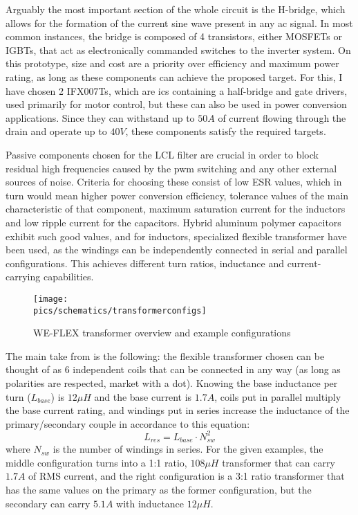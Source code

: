 Arguably the most important section of the whole circuit is the \gls{H-bridge}, which allows for the formation of the current sine wave present in any \gls{ac} signal.
In most common instances, the bridge is composed of 4 transistors, either MOSFETs or IGBTs, that act as electronically commanded switches to the inverter system. On this prototype, size and cost are a priority over efficiency and maximum power rating, as long as these components can achieve the proposed target.
For this, I have chosen 2 IFX007Ts, which are \gls{ic}s containing a half-bridge and gate drivers, used primarily for motor control, but these can also be used in power conversion applications.
Since they can withstand up to $50A$ of current flowing through the drain and operate up to $40V$, these components satisfy the required targets.

Passive components chosen for the LCL filter are crucial in order to block residual high frequencies caused by the \gls{pwm} switching and any other external sources of noise\cite{reznik2013lcl, systematiclcl2015}. 
Criteria for choosing these consist of low ESR values, which in turn would mean higher power conversion efficiency, tolerance values of the main characteristic of that component, maximum saturation current for the inductors and low ripple current for the capacitors.
Hybrid aluminum polymer capacitors exhibit such good values, and for inductors, specialized flexible transformer have been used, as the windings can be independently connected in serial and parallel configurations. This achieves different turn ratios, inductance and current-carrying capabilities.

\begin{figure}[!ht]
    \begin{center}\texttt{[image: \\pics/schematics/transformerconfigs]}\end{center}
    \caption{WE-FLEX transformer overview and example configurations}
    \label{fig:transf}
\end{figure}

The main take from  is the following: the flexible transformer chosen can be thought of as 6 independent coils that can be connected in any way (as long as polarities are respected, market with a dot).
Knowing the base inductance per turn ($L_{base}$) is $12\mu H$ and the base current is $1.7A$, coils put in parallel multiply the base current rating, and windings put in series increase the inductance of the primary/secondary couple in accordance to this equation:
\begin{equation}
\label{eq:Lwindings}
L_{res}=L_{base} \cdot N_{sw}^2
\end{equation}
where $N_{sw}$ is the number of windings in series.
For the given examples, the middle configuration turns into a 1:1 ratio, $108\mu H$ transformer that can carry $1.7A$ of RMS current, and the right configuration is a 3:1 ratio transformer that has the same values on the primary as the former configuration, but the secondary can carry $5.1A$ with inductance $12\mu H$.

